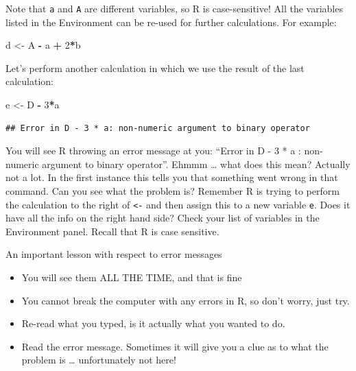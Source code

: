 \documentclass[
]{article}
\newenvironment{Shaded}{\begin{snugshade}}{\end{snugshade}}
\newcommand{\DecValTok}[1]{\textcolor[rgb]{0.00,0.00,0.81}{#1}}
\newcommand{\NormalTok}[1]{#1}
\newcommand{\OtherTok}[1]{\textcolor[rgb]{0.56,0.35,0.01}{#1}}
\newcommand{\SpecialCharTok}[1]{\textcolor[rgb]{0.81,0.36,0.00}{\textbf{#1}}}
\providecommand{\tightlist}{%
  \setlength{\itemsep}{0pt}\setlength{\parskip}{0pt}}
\begin{document}
Note that \texttt{a} and \texttt{A} are different variables, so R is
case-sensitive! All the variables listed in the Environment can be
re-used for further calculations. For example:

\begin{Shaded}
\begin{Highlighting}[]
\NormalTok{d }\OtherTok{\textless{}{-}}\NormalTok{ A }\SpecialCharTok{{-}}\NormalTok{ a }\SpecialCharTok{+} \DecValTok{2}\SpecialCharTok{*}\NormalTok{b}
\end{Highlighting}
\end{Shaded}

Let's perform another calculation in which we use the result of the last
calculation:

\begin{Shaded}
\begin{Highlighting}[]
\NormalTok{e }\OtherTok{\textless{}{-}}\NormalTok{ D }\SpecialCharTok{{-}} \DecValTok{3}\SpecialCharTok{*}\NormalTok{a}
\end{Highlighting}
\end{Shaded}

\begin{verbatim}
## Error in D - 3 * a: non-numeric argument to binary operator
\end{verbatim}

You will see R throwing an error message at you: ``Error in D - 3 * a :
non-numeric argument to binary operator''. Ehmmm \ldots{} what does this
mean? Actually not a lot. In the first instance this tells you that
something went wrong in that command. Can you see what the problem is?
Remember R is trying to perform the calculation to the right of
\texttt{\textless{}-} and then assign this to a new variable \texttt{e}.
Does it have all the info on the right hand side? Check your list of
variables in the Environment panel. Recall that R is case sensitive.

An important lesson with respect to error messages

\begin{itemize}
\tightlist
\item
  You will see them ALL THE TIME, and that is fine
\item
  You cannot break the computer with any errors in R, so don't worry,
  just try.
\item
  Re-read what you typed, is it actually what you wanted to do.
\item
  Read the error message. Sometimes it will give you a clue as to what
  the problem is \ldots{} unfortunately not here!
\end{itemize}
\end{document}
